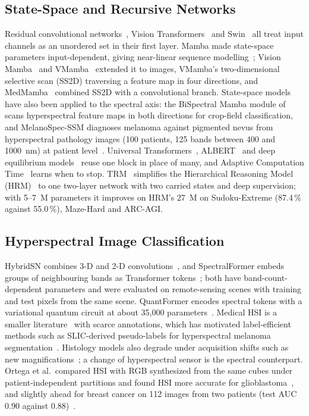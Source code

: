 \documentclass{svproc}
\begin{document}
\subsection{State-Space and Recursive Networks}
Residual convolutional networks~\cite{resnet,convnext}, Vision Transformers~\cite{vit} and Swin~\cite{swin} all treat input channels as an unordered set in their first layer. Mamba made state-space parameters input-dependent, giving near-linear sequence modelling~\cite{mamba}; Vision Mamba~\cite{vim} and VMamba~\cite{vmamba} extended it to images, VMamba's two-dimensional selective scan (SS2D) traversing a feature map in four directions, and MedMamba~\cite{medmamba} combined SS2D with a convolutional branch. State-space models have also been applied to the spectral axis: the BiSpectral Mamba module of~\cite{khan2026} scans hyperspectral feature maps in both directions for crop-field classification, and MelanoSpec-SSM diagnoses melanoma against pigmented nevus from hyperspectral pathology images (100 patients, 125 bands between 400 and 1000~nm) at patient level~\cite{melanospec}. Universal Transformers~\cite{ut}, ALBERT~\cite{albert} and deep equilibrium models~\cite{deq} reuse one block in place of many, and Adaptive Computation Time~\cite{act} learns when to stop. TRM~\cite{trm} simplifies the Hierarchical Reasoning Model (HRM)~\cite{hrm} to one two-layer network with two carried states and deep supervision; with 5--7~M parameters it improves on HRM's 27~M on Sudoku-Extreme (87.4\,\% against 55.0\,\%), Maze-Hard and ARC-AGI.

\subsection{Hyperspectral Image Classification}
HybridSN combines 3-D and 2-D convolutions~\cite{hybridsn}, and SpectralFormer embeds groups of neighbouring bands as Transformer tokens~\cite{spectralformer}; both have band-count-dependent parameters and were evaluated on remote-sensing scenes with training and test pixels from the same scene. QuantFormer encodes spectral tokens with a variational quantum circuit at about 35,000 parameters~\cite{quantformer}. Medical HSI is a smaller literature~\cite{lu2014} with scarce annotations, which has motivated label-efficient methods such as SLIC-derived pseudo-labels for hyperspectral melanoma segmentation~\cite{pandey2026}. Histology models also degrade under acquisition shifts such as new magnifications~\cite{fatima2026}; a change of hyperspectral sensor is the spectral counterpart. Ortega et al.\ compared HSI with RGB synthesized from the same cubes under patient-independent partitions and found HSI more accurate for glioblastoma~\cite{ortega2020gbm}, and slightly ahead for breast cancer on 112 images from two patients (test AUC 0.90 against 0.88)~\cite{ortega2020breast}.
\end{document}
